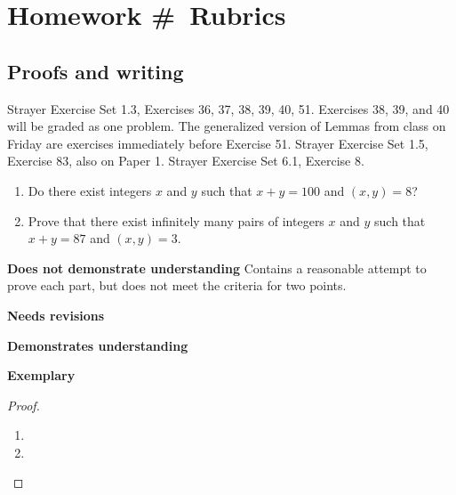 \documentclass[letterpaper, 11pt]{../ximera}
\begin{document}
\chapter{Homework \#\homework\ Rubrics}

\section*{Proofs and writing}  %
Strayer Exercise Set 1.3, Exercises 36, 37, 38, 39, 40, 51. Exercises 38, 39, and 40 will be graded as one problem. 
The generalized version of Lemmas from class on Friday are exercises immediately before Exercise 51.
Strayer Exercise Set 1.5, Exercise 83, also on Paper 1.
Strayer Exercise Set 6.1, Exercise 8.
\begin{ex}
 	\begin{enumerate}[label=(\alph*)] %
		\item Do there exist integers $x$ and $y$ such that $x + y = 100$ and $(x, y) = 8$?

		\item Prove that there exist infinitely many pairs of integers $x$ and $y$ such that $x + y = 87$ and $(x, y) = 3$.
	
	\end{enumerate}
\end{ex}

\begin{writeRubric}
    \item \textbf{Does not demonstrate understanding}
     Contains a reasonable attempt to prove each part, but does not meet the criteria for two points.
    \item \textbf{Needs revisions}
     
    \item \textbf{Demonstrates understanding}
    
    \item \textbf{Exemplary}
        
\end{writeRubric}
                                       \begin{proof}
  	\begin{enumerate}[label=(\alph*)] 
		\item %

		\item %
	
	\end{enumerate}
\end{proof}
\end{document}
